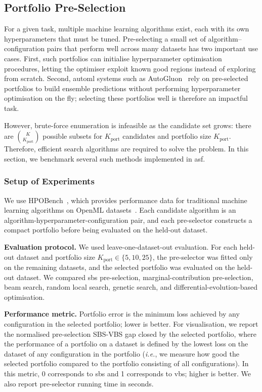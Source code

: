 \subsection{Portfolio Pre-Selection}

For a given task, multiple machine learning algorithms exist, each with its own hyperparameters that must be tuned.
Pre-selecting a small set of algorithm--configuration pairs that perform well across many datasets has two important use cases.
First, such portfolios can initialise hyperparameter optimisation procedures, letting the optimiser exploit known good regions instead of exploring from scratch.
Second, \gls{automl} systems such as AutoGluon~\citep{EriEtAl20} rely on pre-selected portfolios to build ensemble predictions without performing hyperparameter optimisation on the fly; selecting these portfolios well is therefore an impactful task.

However, brute-force enumeration is infeasible as the candidate set grows: there are $\binom{K}{K_{\mathrm{port}}}$ possible subsets for $K_{\mathrm{port}}$ candidates and portfolio size $K_{\mathrm{port}}$.
Therefore, efficient search algorithms are required to solve the problem.
In this section, we benchmark several such methods implemented in \gls{asf}.

\subsubsection{Setup of Experiments}

We use HPOBench~\citep{EggEtAl21}, which provides performance data for traditional machine learning algorithms on OpenML datasets~\citep{BisEtAl21}. Each candidate algorithm is an algorithm-hyperparameter-configuration pair, and each pre-selector constructs a compact portfolio before being evaluated on the held-out dataset.

\textbf{Evaluation protocol.} We used leave-one-dataset-out evaluation. For each held-out dataset and portfolio size $K_{\mathrm{port}}\in\{5,10,25\}$, the pre-selector was fitted only on the remaining datasets, and the selected portfolio was evaluated on the held-out dataset. We compared \gls{sbs} pre-selection, marginal-contribution pre-selection, beam search, random local search, genetic search, and differential-evolution-based optimisation.

\textbf{Performance metric.} Portfolio error is the minimum loss achieved by any configuration in the selected portfolio; lower is better. For visualisation, we report the normalised pre-selection SBS-VBS gap closed by the selected portfolio, where the performance of a portfolio on a dataset is defined by the lowest loss on the dataset of any configuration in the portfolio (\emph{i.e.}, we measure how good the selected portfolio compared to the portfolio consisting of all configurations). In this metric, 0 corresponds to \gls{sbs} and 1 corresponds to \gls{vbs}; higher is better. We also report pre-selector running time in seconds.

